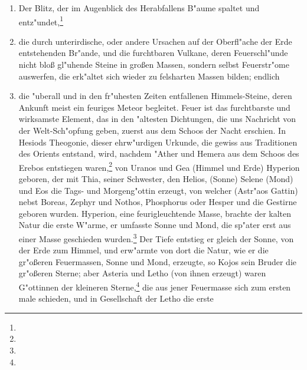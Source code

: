 \documentclass[a4paper, 11pt, oneside, polutonikogreek, german]{article}
\begin{document}
\begin{enumerate}
    \item Der Blitz, der im Augenblick des Herabfallens B"aume spaltet und entz"undet,\footnote{}
    \item die durch unterirdische, oder andere Ursachen auf der Oberfl"ache der Erde entstehenden Br"ande, und die furchtbaren Vulkane, deren Feuerschl"unde nicht bloß gl"uhende Steine in großen Massen, sondern selbst Feuerstr"ome auswerfen, die erk"altet sich wieder zu felsharten Massen bilden; endlich
    \item die "uberall und in den fr"uhesten Zeiten entfallenen Himmels-Steine, deren Ankunft meist ein feuriges Meteor begleitet. Feuer ist das furchtbarste und wirksamste Element, das in den "altesten Dichtungen, die uns Nachricht von der Welt-Sch"opfung geben, zuerst aus dem Schoos der Nacht erschien. In Hesiods Theogonie, dieser ehrw"urdigen Urkunde, die gewiss aus Traditionen des Orients entstand, wird, nachdem "Ather und Hemera aus dem Schoos des Erebos entstiegen waren,\footnote{} von Uranos und Gea (Himmel und Erde) Hyperion geboren, der mit Thia, seiner Schwester, den Helios, (Sonne) Selene (Mond) und Eos die Tags- und Morgeng"ottin erzeugt, von welcher (Astr"aos Gattin) nebst Boreas, Zephyr und Nothos, Phosphorus oder Hesper und die Gestirne geboren wurden. Hyperion, eine feurigleuchtende Masse, brachte der kalten Natur die erste W"arme, er umfasste Sonne und Mond, die sp"ater erst aus einer Masse geschieden wurden.\footnote{} Der Tiefe entstieg er gleich der Sonne, von der Erde zum Himmel, und erw"armte von dort die Natur, wie er die gr"oßeren Feuermassen, Sonne und Mond, erzeugte, so Kojos sein Bruder die gr"oßeren Sterne; aber Asteria und Letho (von ihnen erzeugt) waren G"ottinnen der kleineren Sterne,\footnote{} die aus jener Feuermasse sich zum ersten male schieden, und in Gesellschaft der Letho die erste 
\end{enumerate}
\end{document}
